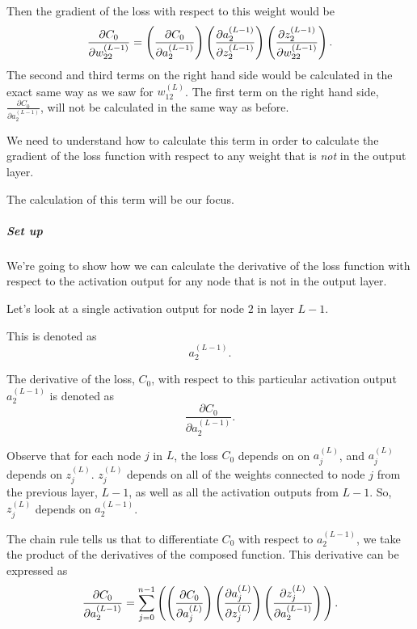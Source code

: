 \documentclass{article}
\begin{document}
Then the gradient of the loss with respect to this weight would be%
\[
\frac{\partial C_{0}}{\partial w_{22}^{(L-1)}}=\left( \frac{\partial C_{0}}{%
\partial a_{2}^{(L-1)}}\right) \left( \frac{\partial a_{2}^{(L-1)}}{\partial
z_{2}^{(L-1)}}\right) \left( \frac{\partial z_{2}^{(L-1)}}{\partial
w_{22}^{(L-1)}}\right) \text{.} 
\]%
The second and third terms on the right hand side would be calculated in the
exact same way as we saw for $w_{12}^{\left( L\right) }$. The first term on
the right hand side, $\frac{\partial C_{0}}{\partial a_{2}^{(L-1)}}$, will
not be calculated in the same way as before.

We need to understand how to calculate this term in order to calculate the
gradient of the loss function with respect to any weight that is \textit{not}
in the output layer.

The calculation of this term will be our focus.

\subparagraph{Set up}

We're going to show how we can calculate the derivative of the loss function%
\newline
with respect to the activation output for any node that is not in the output
layer.

Let's look at a single activation output for node $2$ in layer $L-1$.

This is denoted as%
\[
a_{2}^{(L-1)}\text{.} 
\]

The derivative of the loss, $C_{0}$, with respect to this particular\newline
activation output $a_{2}^{(L-1)}$ is denoted as%
\[
\frac{\partial C_{0}}{\partial a_{2}^{(L-1)}}\text{.} 
\]

Observe that for each node $j$ in $L$, the loss $C_{0}$ depends on on $%
a_{j}^{\left( L\right) }$, and $a_{j}^{\left( L\right) }$ depends on $%
z_{j}^{(L)}$.\newline
$z_{j}^{(L)}$ depends on all of the weights connected to node $j$ from the
previous layer, $L-1$, as well as all the activation outputs from $L-1$. 
\newline
So, $z_{j}^{\left( L\right) }$ depends on $a_{2}^{(L-1)}$.

The chain rule tells us that to differentiate $C_{0}$ with respect to $%
a_{2}^{(L-1)}$, we take the product of the derivatives of the composed
function. This derivative can be expressed as 
\[
\frac{\partial C_{0}}{\partial a_{2}^{(L-1)}}=\sum_{j=0}^{n-1}\left( \left( 
\frac{\partial C_{0}}{\partial a_{j}^{(L)}}\right) \left( \frac{\partial
a_{j}^{(L)}}{\partial z_{j}^{(L)}}\right) \left( \frac{\partial z_{j}^{(L)}}{%
\partial a_{2}^{(L-1)}}\right) \rule[-0.05in]{0in}{0.2in}\right) \text{.} 
\]
\end{document}
